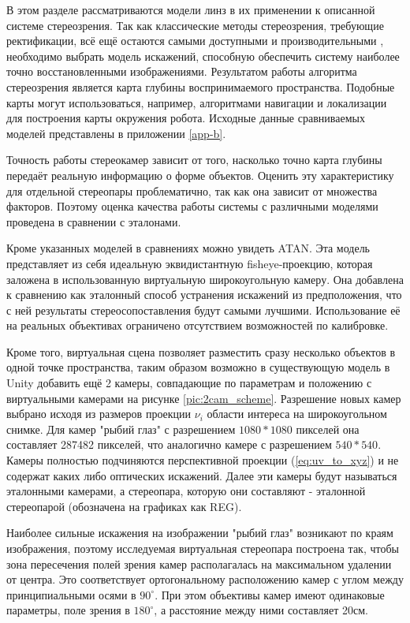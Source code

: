 
В этом разделе рассматриваются модели линз в их применении к описанной системе стереозрения. 
Так как классические методы стереозрения, требующие ректификации, всё ещё остаются самыми доступными и производительными \cite{disparity_review}, 
необходимо выбрать модель искажений, способную обеспечить систему наиболее точно восстановленными изображениями. 
Результатом работы алгоритма стереозрения является карта глубины воспринимаемого пространства. Подобные карты могут
использоваться, например, алгоритмами навигации и локализации для построения карты окружения робота. 
Исходные данные сравниваемых моделей представлены в приложении \ref{app-b}.

Точность работы 
стереокамер зависит от того, насколько точно карта глубины передаёт реальную информацию о форме объектов. Оценить 
эту характеристику для отдельной стереопары проблематично, так как она зависит от множества факторов. Поэтому оценка 
качества работы системы с различными моделями проведена в сравнении с  эталонами.

Кроме указанных моделей в сравнениях можно увидеть ATAN. Эта модель представляет из себя идеальную эквидистантную fisheye-проекцию, 
которая заложена в использованную виртуальную широкоугольную камеру. 
Она добавлена к сравнению как эталонный способ устранения искажений из предположения, что с ней результаты стереосопоставления будут 
самыми лучшими. Использование её на реальных объективах ограничено отсутствием возможностей по калибровке. 

Кроме того, виртуальная сцена позволяет разместить сразу несколько объектов в одной точке пространства, таким образом возможно
в существующую модель в Unity добавить ещё 2 камеры, совпадающие по параметрам и положению с виртуальными камерами на 
рисунке \ref{pic:2cam_scheme}. Разрешение новых камер выбрано исходя из размеров проекции $\nu_i$ области интереса на широкоугольном
снимке. Для камер "рыбий глаз" с разрешением $1080*1080$ пикселей она составляет 287482 пикселей, что аналогично камере 
с разрешением $540*540$. Камеры полностью подчиняются перспективной проекции (\ref{eq:uv_to_xyz}) и не содержат каких либо оптических искажений.
 Далее эти камеры будут называться эталонными камерами, а стереопара, которую они составляют - эталонной стереопарой (обозначена на графиках как REG).

Наиболее сильные искажения на изображении "рыбий глаз" возникают по краям изображения, поэтому исследуемая виртуальная стереопара построена так,
чтобы зона пересечения полей зрения камер располагалась на максимальном удалении от центра. Это соответствует ортогональному расположению
камер с углом между принципиальными осями в $90^\circ$.  При этом объективы камер имеют одинаковые параметры, поле зрения в $180^\circ$,
 а расстояние между ними составляет 20см. %

